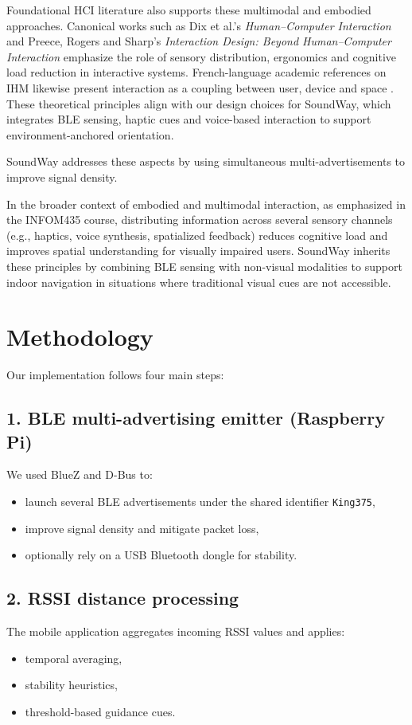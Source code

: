 \documentclass[sigconf]{acmart}
\begin{document}
Foundational HCI literature also supports these multimodal and embodied approaches. Canonical works such as Dix et al.’s \textit{Human–Computer Interaction} \cite{Dix2004} and Preece, Rogers and Sharp’s \textit{Interaction Design: Beyond Human–Computer Interaction} \cite{Preece2015} emphasize the role of sensory distribution, ergonomics and cognitive load reduction in interactive systems. French-language academic references on IHM likewise present interaction as a coupling between user, device and space \cite{IHMcnrs2020}. These theoretical principles align with our design choices for SoundWay, which integrates BLE sensing, haptic cues and voice-based interaction to support environment-anchored orientation.

SoundWay addresses these aspects by using simultaneous multi-advertisements to improve signal density.

In the broader context of embodied and multimodal interaction, as emphasized in the INFOM435 course, distributing information across several sensory channels (e.g., haptics, voice synthesis, spatialized feedback) reduces cognitive load and improves spatial understanding for visually impaired users. SoundWay inherits these principles by combining BLE sensing with non-visual modalities to support indoor navigation in situations where traditional visual cues are not accessible.


\section{Methodology}

Our implementation follows four main steps:

\subsection{1. BLE multi-advertising emitter (Raspberry Pi)}
We used BlueZ and D-Bus to:
\begin{itemize}
    \item launch several BLE advertisements under the shared identifier \texttt{King375},
    \item improve signal density and mitigate packet loss,
    \item optionally rely on a USB Bluetooth dongle for stability.
\end{itemize}

\subsection{2. RSSI distance processing}
The mobile application aggregates incoming RSSI values and applies:
\begin{itemize}
    \item temporal averaging,
    \item stability heuristics,
    \item threshold-based guidance cues.
\end{itemize}
\end{document}
